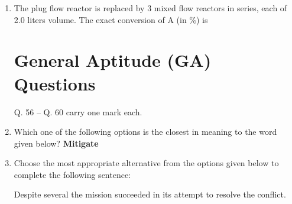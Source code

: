 \documentclass[journal,12pt,onecolumn]{IEEEtran}
\theoremstyle{remark}
\begin{document}
\begin{enumerate}
\item The plug flow reactor is replaced by 3 mixed flow reactors in series, each of 2.0 liters volume. The exact conversion of A (in $\%$) is
\hfill{}
\begin{enumerate}
\end{enumerate}

\section*{General Aptitude (GA) Questions}
Q. 56 -- Q. 60 carry one mark each.

\item Which one of the following options is the closest in meaning to the word given below?
     \textbf{Mitigate}
     \hfill{}
    \begin{enumerate}
    \end{enumerate}

\item Choose the most appropriate alternative from the options given below to complete the following sentence:

Despite several \underline{\hspace{1cm}} the mission succeeded in its attempt to resolve the conflict.
\hfill{}
    \begin{enumerate}
    \end{enumerate}


\end{enumerate}
\end{document}
